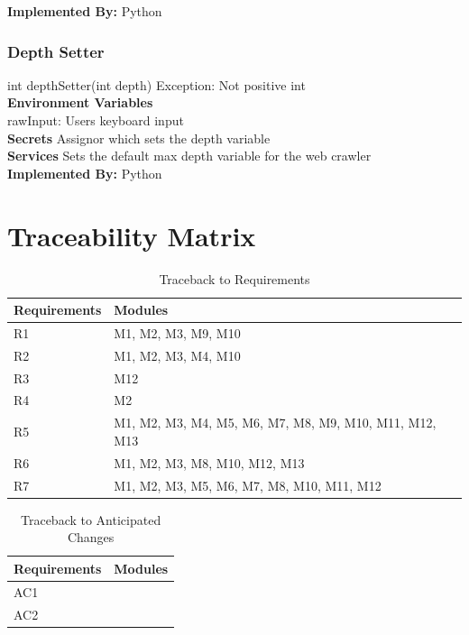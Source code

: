 \documentclass[titlepage]{article}
\begin{document}
\textbf{Implemented By:}
Python

\subsubsection{Depth Setter}
int depthSetter(int depth) Exception: Not positive int\\

\textbf{Environment Variables}\\
rawInput: Users keyboard input\\

\textbf{Secrets}
Assignor which sets the depth variable\\

\textbf{Services}
Sets the default max depth variable for the web crawler\\

\textbf{Implemented By:}
Python

\section{Traceability Matrix}
\begin{table}[h!]
\centering
    \begin{tabular}{| p{5cm} | p{5cm} |}    \hline
    Requirements &Modules\\ \hline
    
      R1  &M1, M2, M3, M9, M10 \\ \hline
      R2  &M1, M2, M3, M4, M10 \\ \hline
      R3  &M12 \\ \hline
      R4  &M2 \\ \hline
      R5  &M1, M2, M3, M4, M5, M6, M7, M8, M9, M10, M11, M12, M13 \\ \hline
      R6  &M1, M2, M3, M8, M10, M12, M13 \\ \hline
      R7  &M1, M2, M3, M5, M6, M7, M8, M10, M11, M12 \\ \hline
      
    \end{tabular}
    \caption{Traceback to Requirements}
\label{table:Traceback to Requirements}
\end{table}

\begin{table}[h!]
\centering
    \begin{tabular}{| p{5cm} | p{5cm} |}    \hline
    Requirements &Modules\\ \hline
    
      AC1  & \\ \hline
      AC2  & \\ \hline
      
    \end{tabular}
    \caption{Traceback to Anticipated Changes}
\label{table:Traceback to Anticipated Changes}
\end{table}
\end{document}
